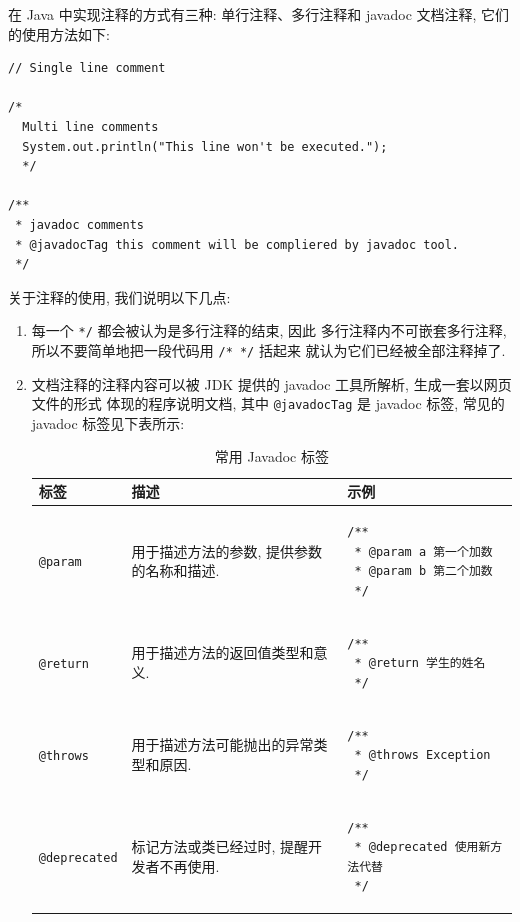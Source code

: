 \documentclass[10pt,UTF8]{book} %
\begin{document}
在 Java 中实现注释的方式有三种: 单行注释、多行注释和 javadoc 文档注释, 它们的使用方法如下:
\begin{lstlisting}
// Single line comment

/*
  Multi line comments
  System.out.println("This line won't be executed.");
  */

/**
 * javadoc comments
 * @javadocTag this comment will be compliered by javadoc tool.
 */
\end{lstlisting}
关于注释的使用, 我们说明以下几点:
\begin{enumerate}
    \item 每一个 \lstinline|*/| 都会被认为是多行注释的结束, 因此
    多行注释内不可嵌套多行注释, 所以不要简单地把一段代码用 \lstinline|/* */| 括起来
    就认为它们已经被全部注释掉了.
    \item 文档注释的注释内容可以被 JDK 提供的 javadoc 工具所解析, 生成一套以网页文件的形式
    体现的程序说明文档, 其中 \lstinline|@javadocTag| 是 javadoc 标签, 常见的 javadoc
    标签见下表所示:
    \begin{table}[H]
        \centering
        \caption{常用 Javadoc 标签}
        \begin{tabular}{p{2.5cm} p{5cm} p{7cm}}
            \hline
            \textbf{标签} & \textbf{描述} & \textbf{示例} \\
            \hline
            \lstinline|@param| & 用于描述方法的参数, 提供参数的名称和描述.  & 
            \begin{lstlisting}
/**
 * @param a 第一个加数
 * @param b 第二个加数
 */
            \end{lstlisting} \\
                              \hline
            \lstinline|@return| & 用于描述方法的返回值类型和意义.  & 
            \begin{lstlisting}
/**
 * @return 学生的姓名
 */
            \end{lstlisting} \\
                              \hline
            \lstinline|@throws| & 用于描述方法可能抛出的异常类型和原因.  & 
            \begin{lstlisting}
/**
 * @throws Exception
 */
            \end{lstlisting} \\
                              \hline
            \lstinline|@deprecated| & 标记方法或类已经过时, 提醒开发者不再使用.  & 
            \begin{lstlisting}
/**
 * @deprecated 使用新方法代替
 */
            \end{lstlisting} \\

\end{tabular}
\end{table}
\end{enumerate}
\end{document}
